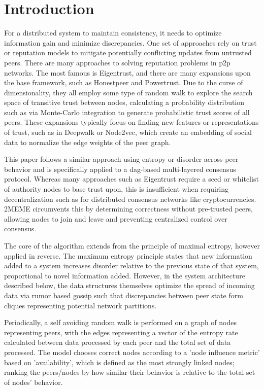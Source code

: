 \documentclass{article}
\theoremstyle{definition}
\theoremstyle{remark}
\theoremstyle{plain}
\begin{document}
\section{Introduction}
For a distributed system to maintain consistency, it needs to optimize information gain and minimize discrepancies. One set of approaches rely on trust or reputation models to mitigate potentially conflicting updates from untrusted peers. There are many approaches to solving reputation problems in p2p networks. The most famous is Eigentrust, and there are many expansions upon the base framework, such as Honestpeer and Powertrust. Due to the curse of dimensionality, they all employ some type of random walk to explore the search space of transitive trust between nodes, calculating a probability distribution such as via Monte-Carlo integration to generate probabilistic trust scores of all peers. These expansions typically focus on finding new features or representations of trust, such as in Deepwalk or Node2vec, which create an embedding of social data to normalize the edge weights of the peer graph.

This paper follows a similar approach using entropy or disorder across peer behavior and is specifically applied to a dag-based multi-layered consensus protocol. Whereas many approaches such as Eigentrust require a seed or whitelist of authority nodes to base trust upon, this is insufficient when requiring decentralization such as for distributed consensus networks like cryptocurrencies. 2MEME circumvents this by determining correctness without pre-trusted peers, allowing nodes to join and leave and preventing centralized control over consensus.

The core of the algorithm extends from the principle of maximal entropy, however applied in reverse. The maximum entropy principle states that new information added to a system increases disorder relative to the previous state of that system, proportional to novel information added. However, in the system architecture described below, the data structures themselves optimize the spread of incoming data via rumor based gossip such that discrepancies between peer state form cliques representing potential network partitions.

Periodically, a self avoiding random walk is performed on a graph of nodes representing peers, with the edges representing a vector of the entropy rate calculated between data processed by each peer and the total set of data processed. The model chooses correct nodes according to a 'node influence metric' based on 'availability', which is defined as the most strongly linked nodes; ranking the peers/nodes by how similar their behavior is relative to the total set of nodes' behavior.
\end{document}
